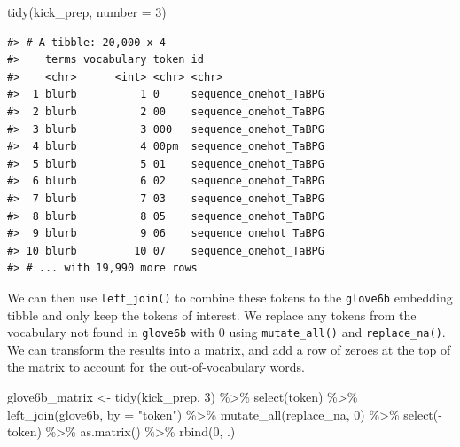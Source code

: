 \documentclass[
]{krantz}
\makeatletter
\newenvironment{Shaded}{\begin{snugshade}}{\end{snugshade}}
\newcommand{\AttributeTok}[1]{\textcolor[rgb]{0.77,0.63,0.00}{#1}}
\newcommand{\DecValTok}[1]{\textcolor[rgb]{0.00,0.00,0.81}{#1}}
\newcommand{\FunctionTok}[1]{\textcolor[rgb]{0.00,0.00,0.00}{#1}}
\newcommand{\NormalTok}[1]{#1}
\newcommand{\OtherTok}[1]{\textcolor[rgb]{0.56,0.35,0.01}{#1}}
\newcommand{\SpecialCharTok}[1]{\textcolor[rgb]{0.00,0.00,0.00}{#1}}
\newcommand{\StringTok}[1]{\textcolor[rgb]{0.31,0.60,0.02}{#1}}
\newenvironment{kframe}{%
\medskip{}
\setlength{\fboxsep}{.8em}
 \def\at@end@of@kframe{}%
 \ifinner\ifhmode%
  \def\at@end@of@kframe{\end{minipage}}%
  \begin{minipage}{\columnwidth}%
 \fi\fi%
 \def\FrameCommand##1{\hskip\@totalleftmargin \hskip-\fboxsep
 \colorbox{shadecolor}{##1}\hskip-\fboxsep
     \hskip-\linewidth \hskip-\@totalleftmargin \hskip\columnwidth}%
 \MakeFramed {\advance\hsize-\width
   \@totalleftmargin\z@ \linewidth\hsize
   \@setminipage}}%
 {\par\unskip\endMakeFramed%
 \at@end@of@kframe}
\renewenvironment{Shaded}{\begin{kframe}}{\end{kframe}}
\makeatother
\begin{document}
\begin{Shaded}
\begin{Highlighting}[]
\FunctionTok{tidy}\NormalTok{(kick\_prep, }\AttributeTok{number =} \DecValTok{3}\NormalTok{)}
\end{Highlighting}
\end{Shaded}

\begin{verbatim}
#> # A tibble: 20,000 x 4
#>    terms vocabulary token id                   
#>    <chr>      <int> <chr> <chr>                
#>  1 blurb          1 0     sequence_onehot_TaBPG
#>  2 blurb          2 00    sequence_onehot_TaBPG
#>  3 blurb          3 000   sequence_onehot_TaBPG
#>  4 blurb          4 00pm  sequence_onehot_TaBPG
#>  5 blurb          5 01    sequence_onehot_TaBPG
#>  6 blurb          6 02    sequence_onehot_TaBPG
#>  7 blurb          7 03    sequence_onehot_TaBPG
#>  8 blurb          8 05    sequence_onehot_TaBPG
#>  9 blurb          9 06    sequence_onehot_TaBPG
#> 10 blurb         10 07    sequence_onehot_TaBPG
#> # ... with 19,990 more rows
\end{verbatim}

We can then use \texttt{left\_join()} to combine these tokens to the \texttt{glove6b} embedding tibble and only keep the tokens of interest. We replace any tokens from the vocabulary not found in \texttt{glove6b} with 0 using \texttt{mutate\_all()} and \texttt{replace\_na()}. We can transform the results into a matrix, and add a row of zeroes at the top of the matrix to account for the out-of-vocabulary words.

\begin{Shaded}
\begin{Highlighting}[]
\NormalTok{glove6b\_matrix }\OtherTok{\textless{}{-}} \FunctionTok{tidy}\NormalTok{(kick\_prep, }\DecValTok{3}\NormalTok{) }\SpecialCharTok{\%\textgreater{}\%}
  \FunctionTok{select}\NormalTok{(token) }\SpecialCharTok{\%\textgreater{}\%}
  \FunctionTok{left\_join}\NormalTok{(glove6b, }\AttributeTok{by =} \StringTok{"token"}\NormalTok{) }\SpecialCharTok{\%\textgreater{}\%}
  \FunctionTok{mutate\_all}\NormalTok{(replace\_na, }\DecValTok{0}\NormalTok{) }\SpecialCharTok{\%\textgreater{}\%}
  \FunctionTok{select}\NormalTok{(}\SpecialCharTok{{-}}\NormalTok{token) }\SpecialCharTok{\%\textgreater{}\%}
  \FunctionTok{as.matrix}\NormalTok{() }\SpecialCharTok{\%\textgreater{}\%}
  \FunctionTok{rbind}\NormalTok{(}\DecValTok{0}\NormalTok{, .)}
\end{Highlighting}
\end{Shaded}
\end{document}
